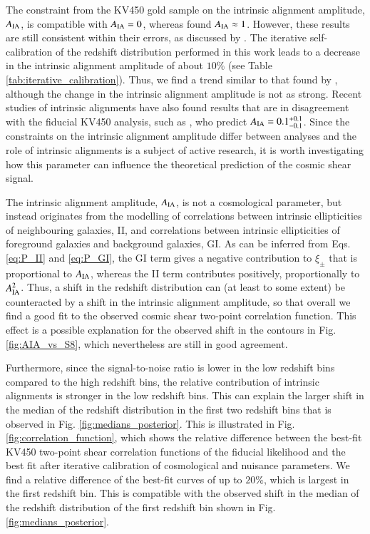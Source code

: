 \documentclass{aa}
\begin{document}
The constraint from the KV450 gold sample on the intrinsic alignment amplitude, $A_{\rm IA}$, is compatible with $A_{\rm IA} = 0$, whereas \cite{hildebrandt18} found $A_{\rm IA} \approx 1$. However, these results are still consistent within their errors, as discussed by \cite{wright_som_kv450}. The iterative self-calibration of the redshift distribution performed in this work leads to a decrease in the intrinsic alignment amplitude of about $10\%$ (see Table \ref{tab:iterative_calibration}). Thus, we find a trend similar to that found by \cite{wright_som_kv450}, although the change in the intrinsic alignment amplitude is not as strong. Recent studies of intrinsic alignments have also found results that are in disagreement with the fiducial KV450 analysis, such as \cite{fortuna20}, who predict $A_{\rm IA} = 0.1 ^{+0.1}_{-0.1}$. Since the constraints on the intrinsic alignment amplitude differ between analyses and the role of intrinsic alignments is a subject of active research, it is worth investigating how this parameter can influence the theoretical prediction of the cosmic shear signal.

The intrinsic alignment amplitude, $A_{\rm IA}$, is not a cosmological parameter, but instead originates from the modelling of correlations between intrinsic ellipticities of neighbouring galaxies, II, and correlations between intrinsic ellipticities of foreground galaxies and background galaxies, GI. As can be inferred from Eqs. \eqref{eq:P_II} and \eqref{eq:P_GI}, the GI term gives a negative contribution to $\xi_\pm$ that is proportional to $A_{\rm IA}$, whereas the II term contributes positively, proportionally to $A_{\rm IA}^2$. Thus, a shift in the redshift distribution can (at least to some extent) be counteracted by a shift in the intrinsic alignment amplitude, so that overall we find a good fit to the observed cosmic shear two-point correlation function. This effect is a possible explanation for the observed shift in the contours in Fig. \ref{fig:AIA_vs_S8}, which nevertheless are still in good agreement. 

Furthermore, since the signal-to-noise ratio is lower in the low redshift bins compared to the high redshift bins, the relative contribution of intrinsic alignments is stronger in the low redshift bins. This can explain the larger shift in the median of the redshift distribution in the first two redshift bins that is observed in Fig. \ref{fig:medians_posterior}. This is illustrated in Fig. \ref{fig:correlation_function}, which shows the relative difference between the best-fit KV450 two-point shear correlation functions of the fiducial likelihood and the best fit after iterative calibration of cosmological and nuisance parameters. We find a relative difference of the best-fit curves of up to $20 \%$, which is largest in the first redshift bin. This is compatible with the observed shift in the median of the redshift distribution of the first redshift bin shown in Fig. \ref{fig:medians_posterior}. 
\end{document}
